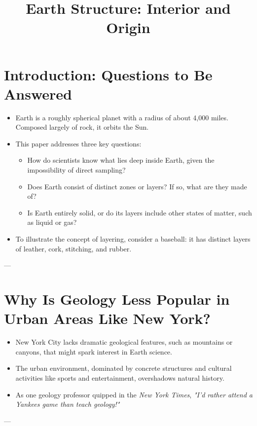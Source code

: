 \documentclass[12pt]{article}
\title{Earth Structure: Interior and Origin}
\author{}
\date{}
\begin{document}
\maketitle

\section*{Introduction: Questions to Be Answered}
\begin{itemize}
    \item Earth is a roughly spherical planet with a radius of about 4,000 miles. Composed largely of rock, it orbits the Sun.
    \item This paper addresses three key questions:
    \begin{itemize}
        \item How do scientists know what lies deep inside Earth, given the impossibility of direct sampling?
        \item Does Earth consist of distinct zones or layers? If so, what are they made of?
        \item Is Earth entirely solid, or do its layers include other states of matter, such as liquid or gas?
    \end{itemize}
    \item To illustrate the concept of layering, consider a baseball: it has distinct layers of leather, cork, stitching, and rubber.
\end{itemize}

---

\section*{Why Is Geology Less Popular in Urban Areas Like New York?}
\begin{itemize}
    \item New York City lacks dramatic geological features, such as mountains or canyons, that might spark interest in Earth science.
    \item The urban environment, dominated by concrete structures and cultural activities like sports and entertainment, overshadows natural history.
    \item As one geology professor quipped in the \textit{New York Times}, \textit{"I'd rather attend a Yankees game than teach geology!"}
\end{itemize}

---
\end{document}
